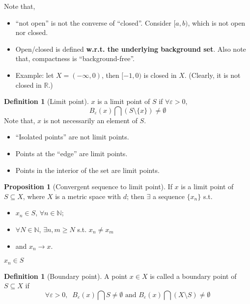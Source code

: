 \documentclass[12pt]{article}
\newcommand{\N}{{\mathbb N}}
\newcommand{\R}{{\mathbb R}}
\theoremstyle{definition}
\newtheorem{definition}[theorem]{Definition}
\newtheorem{proposition}[theorem]{Proposition}
\theoremstyle{plain}
\begin{document}
Note that,
\begin{itemize}
    \item ``not open'' is not the converse of ``closed''. Consider $[a,b)$,
        which is not open nor closed.
    \item Open/closed is defined \textbf{w.r.t. the underlying background set}.
        Also note that, compactness is ``background-free''.
    \item Example: let $X = (-\infty, 0)$, then $[-1,0)$ is closed in $X$.
        (Clearly, it is not closed in $\R$.)
\end{itemize}

\begin{definition}
    [Limit point]
    $x$ is a limit point of $S$ if $\forall \varepsilon > 0$,
    \[
        B_\varepsilon(x) \bigcap \left( S \setminus \{x \} \right) \not =
        \emptyset
    \]
    Note that, $x$ is not necessarily an element of $S$.
\end{definition}

\begin{itemize}
    \item ``Isolated points'' are not limit points.
    \item Points at the ``edge'' are limit points.
    \item Points in the interior of the set are limit points.
\end{itemize}

\begin{proposition}
    [Convergent sequence to limit point]
    If $x$ is a limit point of $S \subseteq X$, where $X$ is a metric space with
    $d$; then $\exists$ a sequence $\{x_n\}$ s.t.
    \begin{itemize}
        \item $x_n \in S$, $\forall n\in \N$;
        \item $\forall N \in \N$, $\exists n, m \ge N$ s.t. $x_n \not = x_m$
        \item and $x _n \to x$.
    \end{itemize}
    $x_n \in S$
\end{proposition}

\begin{definition}
    [Boundary point]
    A point $x \in X$ is called a boundary point of $S \subseteq X$ if
    \[
        \forall \varepsilon > 0, \; \; B_\varepsilon (x) \bigcap  S\not= \emptyset \text{ and }
        B_\varepsilon(x) \bigcap \left( X \setminus S \right) \not = \emptyset
    \]
\end{definition}
\end{document}
